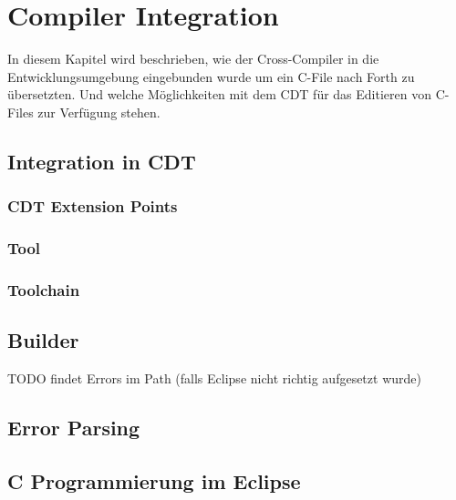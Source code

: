 \chapter{Compiler Integration}
\label{compilerintegration}

In diesem Kapitel wird beschrieben, wie der Cross-Compiler in die Entwicklungsumgebung eingebunden wurde um ein C-File nach Forth zu übersetzten. Und welche Möglichkeiten mit dem CDT für das Editieren von C-Files zur Verfügung stehen.

\section{Integration in CDT}

\subsection{CDT Extension Points}

\subsection{Tool}

\subsection{Toolchain}

\section{Builder}

TODO findet Errors im Path (falls Eclipse nicht richtig aufgesetzt wurde)

\section{Error Parsing}

\section{C Programmierung im Eclipse}


